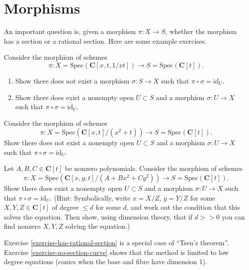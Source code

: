 \section{Morphisms}
\label{section-morphisms}

\noindent
An important question is, given a morphism $\pi : X \to S$,
whether the morphism has a section or a rational section.
Here are some example exercises.

\begin{exercise}
\label{exercise-no-section}
Consider the morphism of schemes
$$
\pi :
X = \text{Spec}(\mathbf{C}[x, t, 1/xt])
\longrightarrow
S = \text{Spec}(\mathbf{C}[t]).
$$
\begin{enumerate}
\item Show there does not exist a morphism $\sigma : S \to X$
such that $\pi \circ \sigma = \text{id}_U$.
\item Show there does exist a nonempty open $U \subset S$ and
a morphism $\sigma : U \to X$ such that $\pi \circ \sigma = \text{id}_U$.
\end{enumerate}
\end{exercise}

\begin{exercise}
\label{exercise-no-rational-section}
Consider the morphism of schemes
$$
\pi :
X = \text{Spec}(\mathbf{C}[x, t]/(x^2 + t))
\longrightarrow
S = \text{Spec}(\mathbf{C}[t]).
$$
Show there does not exist a nonempty open $U \subset S$ and
a morphism $\sigma : U \to X$ such that $\pi \circ \sigma = \text{id}_U$.
\end{exercise}

\begin{exercise}
\label{exercise-has-rational-section}
Let $A, B, C \in \mathbf{C}[t]$ be nonzero polynomials.
Consider the morphism of schemes
$$
\pi :
X = \text{Spec}(\mathbf{C}[x, y, t]/(A + Bx^2 + Cy^2))
\longrightarrow
S = \text{Spec}(\mathbf{C}[t]).
$$
Show there does exist a nonempty open $U \subset S$ and
a morphism $\sigma : U \to X$ such that $\pi \circ \sigma = \text{id}_U$.
(Hint: Symbolically, write $x = X/Z$, $y = Y/Z$ for some
$X, Y, Z \in \mathbf{C}[t]$ of degree $\leq d$ for some $d$,
and work out the condition that this solves the equation.
Then show, using dimension theory, that if $d >> 0$ you can find
nonzero $X, Y, Z$ solving the equation.)
\end{exercise}

\begin{remark}
\label{remark-tsen}
Exercise \ref{exercise-has-rational-section}
is a special case of ``Tsen's theorem''.
Exercise \ref{exercise-no-section-curve} shows that the
method is limited to low degree equations (conics when the base and
fibre have dimension 1).
\end{remark}

